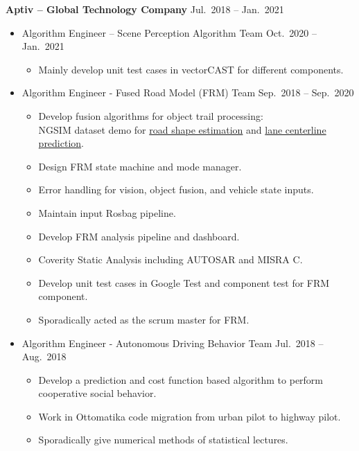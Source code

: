 \documentclass[a4paper,10pt,dvipdfmx]{article}
\def\CC{{C\nolinebreak[4]\hspace{-.05em}\raisebox{.4ex}{\tiny\bf ++}}}
\begin{document}
\textbf{Aptiv -- Global Technology Company} \hfill Jul.~2018 -- Jan.~2021
\begin{itemize}[noitemsep,nolistsep]
	\item[] Algorithm Engineer -- Scene Perception Algorithm Team \hfill Oct.~2020 -- Jan.~2021
    \begin{itemize}[noitemsep,nolistsep]
      \item Mainly develop unit test cases in vectorCAST for different components.
    \end{itemize}
  \item[] Algorithm Engineer - Fused Road Model (FRM) Team \hfill Sep.~2018 -- Sep.~2020
    \begin{itemize}[noitemsep,nolistsep]
      \item Develop fusion algorithms for object trail processing:\\
        NGSIM dataset demo for \href{https://youtu.be/nBhEnkIcLKs}{road shape estimation} and \href{https://youtu.be/2v-jDRaczJs}{lane centerline prediction}.
      \item Design FRM state machine and mode manager.
      \item Error handling for vision, object fusion, and vehicle state inputs.
      \item Maintain input Rosbag pipeline.
      \item Develop FRM analysis pipeline and dashboard.
      \item Coverity Static Analysis including AUTOSAR and MISRA \CC.
      \item Develop unit test cases in Google Test and component test for FRM component.
      \item Sporadically acted as the scrum master for FRM.
    \end{itemize}
  \item[] Algorithm Engineer - Autonomous Driving Behavior Team \hfill Jul.~2018 -- Aug.~2018
    \begin{itemize}[noitemsep,nolistsep]
      \item Develop a prediction and cost function based algorithm to perform cooperative social behavior.
      \item Work in Ottomatika code migration from urban pilot to highway pilot.
      \item Sporadically give numerical methods of statistical lectures.\\
    \end{itemize}
\end{itemize}
\end{document}
